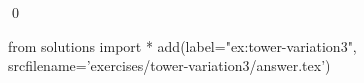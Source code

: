 
\begin{ex} 
  \label{ex:tower-variation3}
  
  \qed
\end{ex} 
\begin{python0}
from solutions import *
add(label="ex:tower-variation3",
    srcfilename='exercises/tower-variation3/answer.tex') 
\end{python0}
